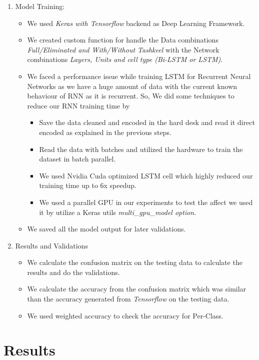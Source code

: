 \begin{enumerate}
 \item Model Training:
 \begin{itemize}
  \item We used \textit{Keras with Tensorflow} backend as Deep Learning Framework.
  \item We created custom function for handle the Data combinations \textit{Full/Eliminated and With/Without Tashkeel} with the Network combinations \textit{Layers, Units and cell type (Bi-LSTM or LSTM)}.
  \item We faced a performance issue while training LSTM for Recurrent Neural Networks as we have a huge amount of data with the current known behaviour of RNN as it is recurrent. So, We did some techniques to reduce our RNN training time by
  \begin{itemize}
   \item Save the data cleaned and encoded in the hard desk and read it direct encoded as explained in the previous steps.
   \item Read the data with batches and utilized the hardware to train the dataset in batch parallel.
   \item We used Nvidia Cuda optimized LSTM cell which highly reduced our training time up to 6x speedup.
   \item We used a parallel GPU in our experiments to test the affect we used it by utilize a Keras utils \textit{multi\_gpu\_model option}.
  \end{itemize}
  \item We saved all the model output for later validations.
 \end{itemize} 

 \item Results and Validations
 \begin{itemize}
  \item We calculate the confusion matrix on the testing data to calculate the results and do the validations.
  \item We calculate the accuracy from the confusion matrix which was similar than the accuracy generated from \textit{Tensorflow} on the testing data.
  \item We used weighted accuracy to check the accuracy for Per-Class.
 \end{itemize}
 
\end{enumerate}

\clearpage

\section{Results}\label{Sec:Results}

